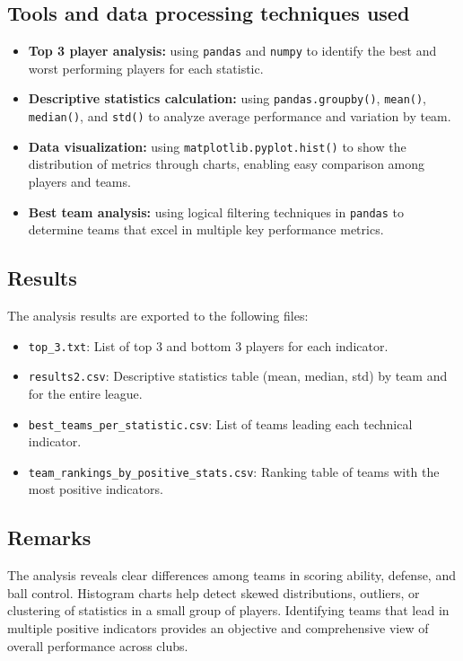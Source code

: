 \documentclass[12pt,a4paper]{article}
\begin{document}
\subsection{Tools and data processing techniques used}
\begin{itemize}
    \item \textbf{Top 3 player analysis:} using \texttt{pandas} and \texttt{numpy} to identify the best and worst performing players for each statistic.
    
    \item \textbf{Descriptive statistics calculation:} using \texttt{pandas.groupby()}, \texttt{mean()}, \texttt{median()}, and \texttt{std()} to analyze average performance and variation by team.
    
    \item \textbf{Data visualization:} using \texttt{matplotlib.pyplot.hist()} to show the distribution of metrics through charts, enabling easy comparison among players and teams.
    
    \item \textbf{Best team analysis:} using logical filtering techniques in \texttt{pandas} to determine teams that excel in multiple key performance metrics.
\end{itemize}

\subsection{Results}
The analysis results are exported to the following files:
\begin{itemize}
    \item \texttt{top\_3.txt}: List of top 3 and bottom 3 players for each indicator.
    \item \texttt{results2.csv}: Descriptive statistics table (mean, median, std) by team and for the entire league.
    \item \texttt{best\_teams\_per\_statistic.csv}: List of teams leading each technical indicator.
    \item \texttt{team\_rankings\_by\_positive\_stats.csv}: Ranking table of teams with the most positive indicators.
\end{itemize}

\subsection{Remarks}
The analysis reveals clear differences among teams in scoring ability, defense, and ball control. Histogram charts help detect skewed distributions, outliers, or clustering of statistics in a small group of players. Identifying teams that lead in multiple positive indicators provides an objective and comprehensive view of overall performance across clubs.
\end{document}
